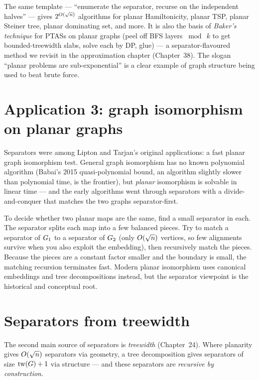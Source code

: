 \begin{applicationbox}
The same template --- ``enumerate the separator, recurse on the independent halves'' --- gives $2^{O(\sqrt n)}$ algorithms for planar Hamiltonicity, planar TSP, planar Steiner tree, planar dominating set, and more. It is also the basis of \emph{Baker's technique} for PTASs on planar graphs (peel off BFS layers $\bmod\ k$ to get bounded-treewidth slabs, solve each by DP, glue) --- a separator-flavoured method we revisit in the approximation chapter (Chapter~38). The slogan ``planar problems are sub-exponential'' is a clear example of graph structure being used to beat brute force.
\end{applicationbox}

\section{Application 3: graph isomorphism on planar graphs}

Separators were among Lipton and Tarjan's original applications: a fast planar graph isomorphism test. General graph isomorphism has no known polynomial algorithm (Babai's 2015 quasi-polynomial bound, an algorithm slightly slower than polynomial time, is the frontier), but \emph{planar} isomorphism is solvable in linear time --- and the early algorithms went through separators with a divide-and-conquer that matches the two graphs separator-first.

\begin{intuitionbox}
To decide whether two planar maps are the same, find a small separator in each. The separator splits each map into a few balanced pieces. Try to match a separator of $G_1$ to a separator of $G_2$ (only $O(\sqrt n)$ vertices, so few alignments survive when you also exploit the embedding), then recursively match the pieces. Because the pieces are a constant factor smaller and the boundary is small, the matching recursion terminates fast. Modern planar isomorphism uses canonical embeddings and tree decompositions instead, but the separator viewpoint is the historical and conceptual root.
\end{intuitionbox}

\section{Separators from treewidth}

The second main source of separators is \emph{treewidth} (Chapter~24). Where planarity gives $O(\sqrt n)$ separators via geometry, a tree decomposition gives separators of size $\operatorname{tw}(G)+1$ via structure --- and these separators are \emph{recursive by construction}.

